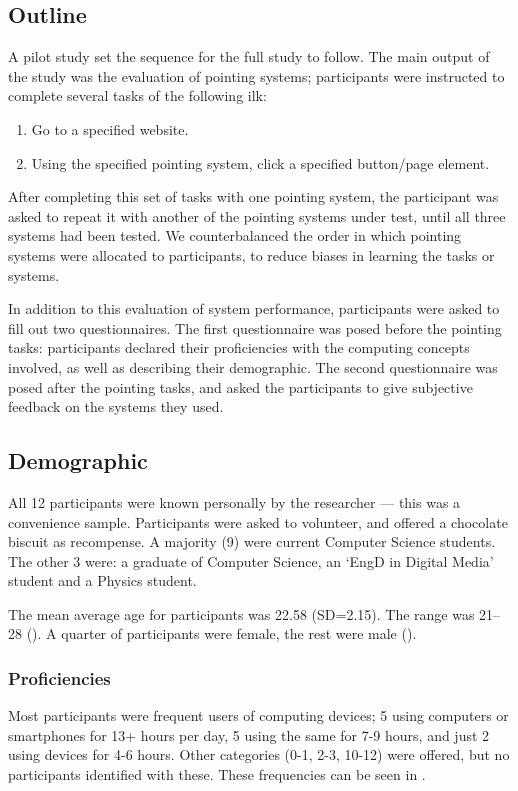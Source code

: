\documentclass[11pt,openright,a4paper]{report}
\begin{document}
\subsection{Outline}
A pilot study set the sequence for the full study to follow. The main output of the study was the evaluation of pointing systems; participants were instructed to complete several tasks of the following ilk:
\begin{enumerate}
\item Go to a specified website.
\item Using the specified pointing system, click a specified button/page element.
\end{enumerate}
After completing this set of tasks with one pointing system, the participant was asked to repeat it with another of the pointing systems under test, until all three systems had been tested. We counterbalanced the order in which pointing systems were allocated to participants, to reduce biases in learning the tasks or systems.

In addition to this evaluation of system performance, participants were asked to fill out two questionnaires. The first questionnaire was posed before the pointing tasks: participants declared their proficiencies with the computing concepts involved, as well as describing their demographic. The second questionnaire was posed after the pointing tasks, and asked the participants to give subjective feedback on the systems they used.

\subsection{Demographic}
All 12 participants were known personally by the researcher --- this was a convenience sample. Participants were asked to volunteer, and offered a chocolate biscuit as recompense. A majority (9) were current Computer Science students. The other 3 were: a graduate of Computer Science, an `EngD in Digital Media' student and a Physics student.

The mean average age for participants was 22.58 (SD=2.15). The range was 21--28 ().
A quarter of participants were female, the rest were male ().

\subsubsection{Proficiencies}
Most participants were frequent users of computing devices; 5 using computers or smartphones for 13+ hours per day, 5 using the same for 7-9 hours, and just 2 using devices for 4-6 hours. Other categories (0-1, 2-3, 10-12) were offered, but no participants identified with these. These frequencies can be seen in .
\end{document}
